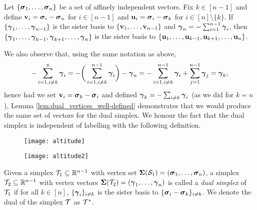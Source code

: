 \begin{lemma}
	\label{lem:dual_vertices_well-defined}
	Let $\{\vb*{\sigma}_1,\dots,\vb*{\sigma}_n\}$ be a set of affinely independent vectors. Fix $k\in [n-1]$ and define $\vb{v}_i=\vb*{\sigma}_i-\vb*{\sigma}_n$ for $i\in[n-1]$ and $\vb{u}_i=\vb*{\sigma}_i-\vb*{\sigma}_k$ for $i\in[n]\setminus\{k\}$. If $\{\vb*{\gamma}_1,\dots,\vb*{\gamma}_{n-1}\}$ is the sister basis to $\{\vb{v}_1,\dots,\vb{v}_{n-1}\}$ and $\vb*{\gamma}_n = -\sum_{i=1}^{n-1}\vb*{\gamma}_i$, then $\{\vb*{\gamma}_1,\dots,\vb*{\gamma}_{k-1},\vb*{\gamma}_{k+1},\dots,\vb*{\gamma}_{n}\}$ is the sister basis to $\{\vb{u}_1,\dots,\vb{u}_{k-1},\vb{u}_{k+1},\dots,\vb{u}_n\}$. 
\end{lemma}


We also observe that, using the same notation as above, 
\[-\sum_{i=1,i\neq k}^n \vb*{\gamma}_i = -\bigg(\sum_{i=1,i\neq k}^{n-1} \vb*{\gamma}_i\bigg) - \vb*{\gamma}_n = -\sum_{i=1,i\neq k}^{n-1}\vb*{\gamma}_i + \sum_{j=1}^{n-1} \vb*{\gamma}_j = \vb*{\gamma}_k,\]
hence had we set $\vb{v}_i=\vb*{\sigma}_k-\vb*{\sigma}_i$ and defined $\vb*{\gamma}_k = -\sum_{i\neq k}\vb*{\gamma}_i$ (as we did for $k=n$), Lemma \ref{lem:dual_vertices_well-defined} demonstrates that we would produce the same set of vectors for the dual simplex. We honour the fact that the dual simplex is independent of labelling with the following definition. 

\begin{figure}
	\centering
	\begin{minipage}{0.45\textwidth}
		\centering
		\texttt{[image: altitude]}
	\end{minipage}
	\begin{minipage}{0.45\textwidth}
		\centering
		\texttt{[image: altitude2]}
	\end{minipage}
\end{figure}


\begin{definition}
\label{def:dual_simplex}
Given a simplex $\mathcal{T}_1\subseteq\mathbb{R}^{n-1}$ with vertex set $\boldsymbol{\Sigma}(\mathcal{S}_1)=(\vb*{\sigma}_1,\dots,\vb*{\sigma}_n)$, a simplex $\mathcal{T}_2\subseteq \mathbb{R}^{n-1}$ with vertex vectors $\boldsymbol{\Sigma}(\mathcal{T}_2)=(\vb*{\gamma}_1,\dots,\vb*{\gamma}_n)$ is called a \emph{dual simplex} of $\mathcal{T}_1$ if for all $k\in[n]$, $\{\vb*{\gamma}_i\}_{i\neq k}$ is the sister basis to $\{\vb*{\sigma}_i-\vb*{\sigma}_k\}_{i\neq k}$. We denote the dual of the simplex $\mathcal{T}$ as $\mathcal{T}^*$. 
\end{definition}

